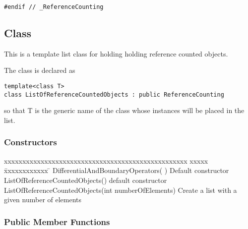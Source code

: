 {\begin{verbatim}
#endif // _ReferenceCounting
\end{verbatim}
}



\subsection{Class \LORCO}

This is a template list class for holding holding 
reference counted objects.

The class is declared as
\begin{verbatim}
template<class T>
class ListOfReferenceCountedObjects : public ReferenceCounting
\end{verbatim}
so that {\ff T} is the generic name of the class whose instances
will be placed in the list.

\subsubsection{Constructors}

\begin{tabbing}
{\ff xxxxxxxxxxxxxxxxxxxxxxxxxxxxxxxxxxxxxxxxxxxxxxxxxx} xxxxx \= xxxxxxxxxxxx \=  \kill
{\ff DifferentialAndBoundaryOperators( )} \> Default constructor \\
{\ff ListOfReferenceCountedObjects()}  \> default constructor \\
{\ff ListOfReferenceCountedObjects(int numberOfElements)} \> Create a list with a given number of elements \\
\end{tabbing}

\subsubsection{Public Member Functions}

